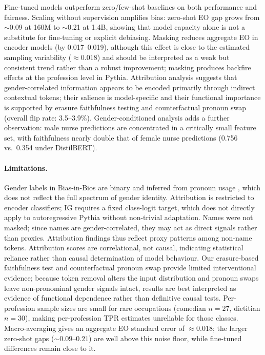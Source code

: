 \documentclass[11pt]{article}
\begin{document}
Fine-tuned models outperform zero/few-shot baselines on both
performance and fairness. Scaling without supervision amplifies bias:
zero-shot EO gap grows from $\sim$0.09 at 160M to $\sim$0.21 at 1.4B,
showing that model capacity alone is not a substitute for fine-tuning
or explicit debiasing. Masking reduces aggregate EO in encoder models
(by 0.017--0.019), although this effect is close to the estimated
sampling variability ($\approx\!0.018$) and should be interpreted as a
weak but consistent trend rather than a robust improvement; masking
produces backfire effects at the profession level in Pythia. Attribution analysis suggests that gender-correlated information
appears to be encoded primarily through indirect contextual tokens; their salience is
model-specific and their functional importance is supported by erasure
faithfulness testing and counterfactual pronoun swap (overall flip rate:
3.5--3.9\%).
Gender-conditioned analysis adds a further observation: male nurse
predictions are concentrated in a critically small feature set, with
faithfulness nearly double that of female nurse predictions
(0.756 vs.\ 0.354 under DistilBERT).

\paragraph{Limitations.}
Gender labels in Bias-in-Bios are binary and inferred from pronoun
usage \citep{de-arteaga-etal-2019-bias}, which does not reflect the
full spectrum of gender identity. Attribution is restricted to encoder classifiers; IG requires a fixed class-logit target, which does not directly apply to autoregressive Pythia without non-trivial adaptation.
Names were not masked; since names are gender-correlated, they may act as direct signals rather than proxies. Attribution findings thus reflect proxy patterns among non-name tokens.
Attribution scores are correlational, not causal, indicating statistical reliance rather than causal determination of model behaviour. Our erasure-based faithfulness test and counterfactual pronoun swap
provide limited interventional evidence; because token removal alters
the input distribution and pronoun swaps leave non-pronominal gender
signals intact, results are best interpreted as evidence of functional
dependence rather than definitive causal tests. Per-profession sample sizes are small for rare occupations (comedian
$n\!=\!27$, dietitian $n\!=\!30$), making per-profession TPR estimates
unreliable for those classes.
Macro-averaging gives an aggregate EO standard error of $\approx\!0.018$;
the larger zero-shot gaps ($\sim\!0.09$--$0.21$) are well above this
noise floor, while fine-tuned differences remain close to it.
\end{document}
